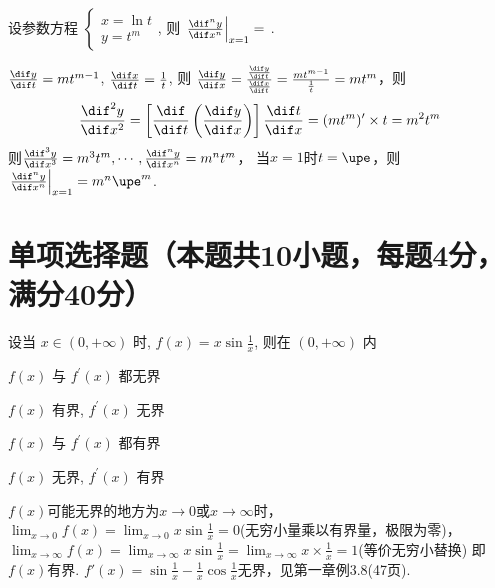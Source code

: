 \documentclass{USTBExam}
\begin{document}
\begin{problem}
  设参数方程 $
    \begin{cases}
      x=\ln t \\
      y=t^{m}
    \end{cases}
  $, 则 $\left.\frac{\dif^{n} y}{\dif x^{n}}\right|_{x=1}=$
  \fillin[$m^n \upe^m$].
\end{problem}

\begin{analysis}
  $\frac{\dif y}{\dif t} = mt^{m-1}$, $\frac{\dif x}{\dif t} = \frac{1}{t}$, 则
  $\frac{\dif y}{\dif x} = \frac{\frac{\dif y}{\dif t}}{\frac{\dif x}{\dif t}} = \frac{mt^{m-1}}{\frac{1}{t}} = mt^m$，则
  $$\frac{\dif^2 y}{\dif x^2} = \left[ \frac{\dif }{\dif t} \left( \frac{\dif y}{\dif x} \right) \right] \frac{\dif t}{\dif x} = (mt^m)' \times t = m^2 t^m$$
  则$\frac{\dif^3 y}{\dif x^3} = m^3 t^m, \cdots, \frac{\dif^n y}{\dif x^n} = m^n t^m$，
  当$x=1$时$t = \upe$，则 $\left.\frac{\dif^{n} y}{\dif x^{n}}\right|_{x=1}=m^n \upe^m$.
\end{analysis}

\section{单项选择题（本题共10小题，每题4分，满分40分）}

\begin{problem}
  设当 $x \in(0,+\infty)$ 时, $f(x)=x \sin \frac{1}{x}$, 则在 $(0,+\infty)$ 内
  \paren[B]
  \begin{choices}
    \item $f(x)$ 与 $f^{\prime}(x)$ 都无界
    \item $f(x)$ 有界, $f^{\prime}(x)$ 无界
    \item $f(x)$ 与 $f^{\prime}(x)$ 都有界
    \item $f(x)$ 无界, $f^{\prime}(x)$ 有界
  \end{choices}
\end{problem}

\begin{analysis}
  $f(x)$可能无界的地方为$x \to 0$或$x \to \infty$时，$\lim _{x \to 0} f(x) = \lim _{x \to 0} x \sin \frac{1}{x} = 0$(无穷小量乘以有界量，极限为零)，
  $\lim _{x \to \infty} f(x) = \lim _{x \to \infty} x \sin \frac{1}{x} = \lim _{x \to \infty} x \times \frac{1}{x} = 1$(等价无穷小替换)
  即$f(x)$有界.
  $f'(x) = \sin \frac{1}{x} - \frac{1}{x} \cos \frac{1}{x}$无界，见第一章例3.8(47页).
\end{analysis}
\end{document}
